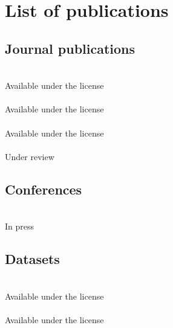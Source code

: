 \chapter{List of publications}

\section*{Journal publications}
\noindent{}%
\\
{\footnotesize Available under the \textsl{} license}\\

\noindent{}\\
{\footnotesize Available under the  license}\\

\noindent{}%
\\
{\footnotesize Available under the  license}\\

\noindent{}\\
{\footnotesize Under review}\\


\section*{Conferences}
\noindent{}\\
{\footnotesize In press}\\

\newpage
\section*{Datasets}
\noindent{}\\
{\footnotesize Available under the  license}\\

\noindent{}\\
{\footnotesize Available under the  license}